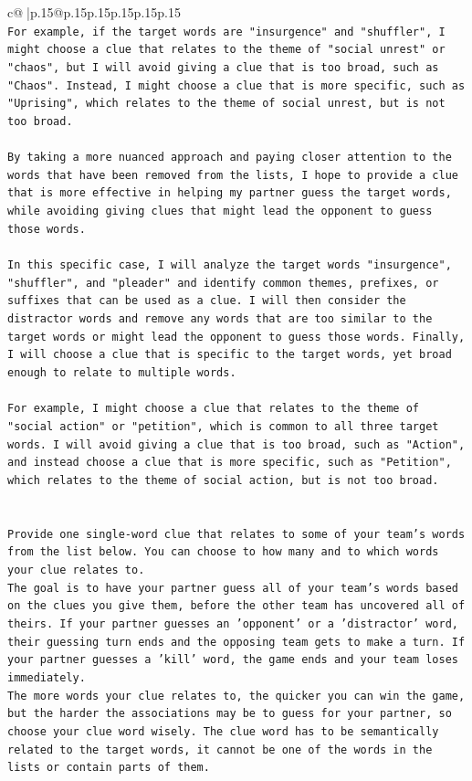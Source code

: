 \documentclass{article}
\begin{document}
{\begin{supertabular}{c@{$\;$}|p{.15\linewidth}@{}p{.15\linewidth}p{.15\linewidth}p{.15\linewidth}p{.15\linewidth}p{.15\linewidth}}
{{{\\ 
\texttt{For example, if the target words are "insurgence" and "shuffler", I might choose a clue that relates to the theme of "social unrest" or "chaos", but I will avoid giving a clue that is too broad, such as "Chaos". Instead, I might choose a clue that is more specific, such as "Uprising", which relates to the theme of social unrest, but is not too broad.} \\
\\ 
\texttt{By taking a more nuanced approach and paying closer attention to the words that have been removed from the lists, I hope to provide a clue that is more effective in helping my partner guess the target words, while avoiding giving clues that might lead the opponent to guess those words.} \\
\\ 
\texttt{In this specific case, I will analyze the target words "insurgence", "shuffler", and "pleader" and identify common themes, prefixes, or suffixes that can be used as a clue. I will then consider the distractor words and remove any words that are too similar to the target words or might lead the opponent to guess those words. Finally, I will choose a clue that is specific to the target words, yet broad enough to relate to multiple words.} \\
\\ 
\texttt{For example, I might choose a clue that relates to the theme of "social action" or "petition", which is common to all three target words. I will avoid giving a clue that is too broad, such as "Action", and instead choose a clue that is more specific, such as "Petition", which relates to the theme of social action, but is not too broad.} \\
\\ 
\\ 
\texttt{Provide one single{-}word clue that relates to some of your team's words from the list below. You can choose to how many and to which words your clue relates to.} \\
\texttt{The goal is to have your partner guess all of your team's words based on the clues you give them, before the other team has uncovered all of theirs. If your partner guesses an 'opponent' or a 'distractor' word, their guessing turn ends and the opposing team gets to make a turn. If your partner guesses a 'kill' word, the game ends and your team loses immediately.} \\
\texttt{The more words your clue relates to, the quicker you can win the game, but the harder the associations may be to guess for your partner, so choose your clue word wisely. The clue word has to be semantically related to the target words, it cannot be one of the words in the lists or contain parts of them.} \\
}}}
\end{supertabular}}
\end{document}
